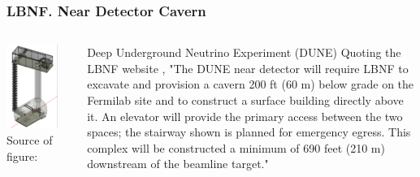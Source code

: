 \begin{frame}\frametitle{LBNF. Near Detector Cavern}

\begin{columns} %
     \begin{column}{5cm} %
     \includegraphics[width=0.80\textwidth, keepaspectratio=true]{figs/nearDetector_project.png}\\
     \tiny Source of figure: \cite{ref_LBNFweb} 
     \end{column}
     \begin{column}{5cm} %
       \scriptsize
       Deep Underground Neutrino Experiment (DUNE)
Quoting the LBNF website \cite{ref_LBNFweb}, "The DUNE near detector will require LBNF to excavate and provision a cavern 200 ft (60 m) below grade on the Fermilab site and to construct a surface building directly above it. An elevator will provide the primary access between the two spaces; the stairway shown is planned for emergency egress. This complex will be constructed a minimum of 690 feet (210 m) downstream of the beamline target."   
     \end{column}
\end{columns}
\end{frame}

